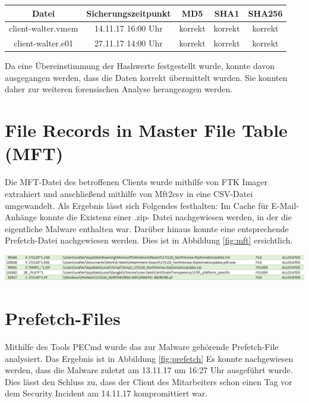 \begin{center}
	\begin{tabular}{|c|c|c|c|c|} 
		\hline
		Datei & Sicherungszeitpunkt & MD5 & SHA1 & SHA256 \\ [0.5ex] 
		\hline
		client-walter.vmem & 14.11.17 16:00 Uhr & korrekt & korrekt & korrekt \\ 
		\hline
		client-walter.e01 & 27.11.17 14:00 Uhr & korrekt & korrekt & korrekt \\ 
		\hline
	\end{tabular}
\end{center}

Da eine Übereinstimmung der Hashwerte festgestellt wurde, konnte davon ausgegangen werden, dass die Daten korrekt übermittelt wurden. Sie konnten daher zur weiteren forensischen Analyse herangezogen werden.

\section{File Records in Master File Table (MFT)}
Die MFT-Datei des betroffenen Clients wurde mithilfe von FTK Imager extrahiert und anschließend mithilfe von Mft2csv in eine CSV-Datei umgewandelt. 
Als Ergebnis lässt sich Folgendes festhalten: Im Cache für E-Mail-Anhänge konnte die Existenz einer .zip- Datei  nachgewiesen werden, in der die eigentliche Malware enthalten war.  Darüber hinaus konnte eine entsprechende Prefetch-Datei  nachgewiesen werden. Dies ist in Abbildung \ref{fig:mft} ersichtlich.

\begin{center}
	\includegraphics[width=15.8cm]{figures/mft.png}
	\label{fig:mft}
\end{center}

\section{Prefetch-Files}
Mithilfe des Tools PECmd wurde das zur Malware gehörende Prefetch-File  analysiert. Das Ergebnis ist in Abbildung \ref{fig:prefetch}
Es konnte nachgewiesen werden, dass die Malware zuletzt am 13.11.17 um 16:27 Uhr ausgeführt wurde. Dies lässt den Schluss zu, dass der Client des Mitarbeiters schon einen Tag vor dem Security Incident am 14.11.17 kompromittiert war.

